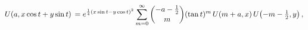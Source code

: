 \[\mathop{U\/}\nolimits\!\left(a,x\mathop{\cos\/}\nolimits t+y\mathop{\sin\/}%
\nolimits t\right)\\
=e^{\frac{1}{4}(x\mathop{\sin\/}\nolimits t-y\mathop{\cos\/}\nolimits t)^{2}}%
\*\sum_{m=0}^{\infty}\binom{-a-\tfrac{1}{2}}{m}(\mathop{\tan\/}\nolimits t)^{m%
}\mathop{U\/}\nolimits\!\left(m+a,x\right)\mathop{U\/}\nolimits\!\left(-m-%
\tfrac{1}{2},y\right),\]